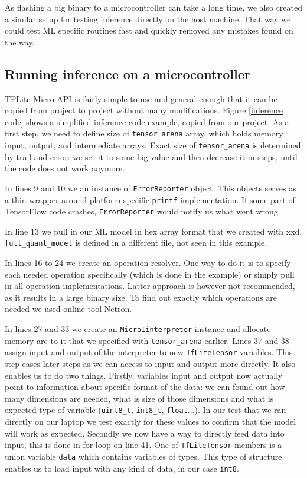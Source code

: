 As flashing a big binary to a microcontroller can take a long time, we also created a similar setup for testing inference directly on the host machine.
That way we could test ML specific routines fast and quickly removed any mistakes found on the way.


\subsection{ Running inference on a microcontroller}

TFLite Micro API is fairly simple to use and general enough that it can be copied from project to project without many modifications.
Figure \ref{inference code} shows a simplified inference code example, copied from our project.
As a first step, we need to define size of \verb|tensor_arena| array, which holds memory input, output, and intermediate arrays.
Exact size of \verb|tensor_arena| is determined by trail and error: we set it to some big value and then decrease it in steps, until the code does not work anymore.

In lines 9 and 10 we an instance of \verb|ErrorReporter| object.
This objects serves as a thin wrapper around platform specific \verb|printf| implementation.
If some part of TensorFlow code crashes, \verb|ErrorReporter| would notify us what went wrong.

In line 13 we pull in our ML model in hex array format that we created with xxd.
\verb|full_quant_model| is defined in a different file, not seen in this example.

In lines 16 to 24 we create an operation resolver.
One way to do it is to specify each needed operation specifically (which is done in the example) or simply pull in all operation implementations.
Latter approach is however not recommended, as it results in a large binary size.
To find out exactly which operations are needed we used online tool Netron\cite{netron}.

In lines 27 and 33 we create an \verb|MicroIinterpreter| instance and allocate memory are to it that we specified with \verb|tensor_arena| earlier.
Lines 37 and 38 assign input and output of the interpreter to new \verb|TfLiteTensor| variables.
This step eases later steps as we can access to input and output more directly.
It also enables us to do two things.
Firstly, variables input and output now actually point to information about specific format of the data: we can found out how many dimensions are needed, what is size of those dimensions and what is expected type of variable (\verb|uint8_t|, \verb|int8_t|, \verb|float|...).
In our test that we ran directly on our laptop we test exactly for these values to confirm that the model will work as expected.
Secondly we now have a way to directly feed data into input, this is done in for loop on line 41.
One of \verb|TfLiteTensor| members is a union variable \verb|data| which contains variables of types.
This type of structure enables us to load input with any kind of data, in our case \verb|int8|.

